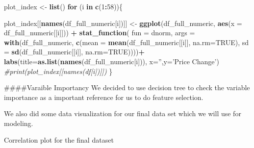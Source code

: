 \documentclass[11pt,]{article}
\newenvironment{Shaded}{\begin{snugshade}}{\end{snugshade}}
\newcommand{\CommentTok}[1]{\textcolor[rgb]{0.56,0.35,0.01}{\textit{#1}}}
\newcommand{\ControlFlowTok}[1]{\textcolor[rgb]{0.13,0.29,0.53}{\textbf{#1}}}
\newcommand{\DataTypeTok}[1]{\textcolor[rgb]{0.13,0.29,0.53}{#1}}
\newcommand{\DecValTok}[1]{\textcolor[rgb]{0.00,0.00,0.81}{#1}}
\newcommand{\KeywordTok}[1]{\textcolor[rgb]{0.13,0.29,0.53}{\textbf{#1}}}
\newcommand{\NormalTok}[1]{#1}
\newcommand{\OperatorTok}[1]{\textcolor[rgb]{0.81,0.36,0.00}{\textbf{#1}}}
\newcommand{\OtherTok}[1]{\textcolor[rgb]{0.56,0.35,0.01}{#1}}
\newcommand{\StringTok}[1]{\textcolor[rgb]{0.31,0.60,0.02}{#1}}
\begin{document}
\begin{Shaded}
\begin{Highlighting}[]
\NormalTok{plot_index <-}\StringTok{ }\KeywordTok{list}\NormalTok{()}
\ControlFlowTok{for}\NormalTok{ (i }\ControlFlowTok{in} \KeywordTok{c}\NormalTok{(}\DecValTok{1}\OperatorTok{:}\DecValTok{58}\NormalTok{))\{}
  
\NormalTok{  plot_index[[}\KeywordTok{names}\NormalTok{(df_full_numeric[i])]] <-}\StringTok{ }\KeywordTok{ggplot}\NormalTok{(df_full_numeric, }\KeywordTok{aes}\NormalTok{(}\DataTypeTok{x =}\NormalTok{ df_full_numeric[[i]])) }\OperatorTok{+}
\StringTok{    }\KeywordTok{stat_function}\NormalTok{(}
      \DataTypeTok{fun =}\NormalTok{ dnorm,}
      \DataTypeTok{args =} \KeywordTok{with}\NormalTok{(df_full_numeric, }\KeywordTok{c}\NormalTok{(}\DataTypeTok{mean =} \KeywordTok{mean}\NormalTok{(df_full_numeric[[i]], }\DataTypeTok{na.rm=}\OtherTok{TRUE}\NormalTok{), }
                            \DataTypeTok{sd =} \KeywordTok{sd}\NormalTok{(df_full_numeric[[i]], }\DataTypeTok{na.rm=}\OtherTok{TRUE}\NormalTok{))))}\OperatorTok{+}
\StringTok{    }\KeywordTok{labs}\NormalTok{(}\DataTypeTok{title=}\KeywordTok{as.list}\NormalTok{(}\KeywordTok{names}\NormalTok{(df_full_numeric[i])), }\DataTypeTok{x=}\StringTok{''}\NormalTok{,}\DataTypeTok{y=}\StringTok{'Price Change'}\NormalTok{)}
  \CommentTok{#print(plot_index[[names(df[i])]])}
\NormalTok{\}}
\end{Highlighting}
\end{Shaded}

\#\#\#\#Varaible Importancy We decided to use decision tree to check the
variable importance as a important reference for us to do feature
selection.

\begin{Shaded}
\end{Shaded}

We also did some data visualization for our final data set which we will
use for modeling.

Correlation plot for the final dataset
\end{document}
